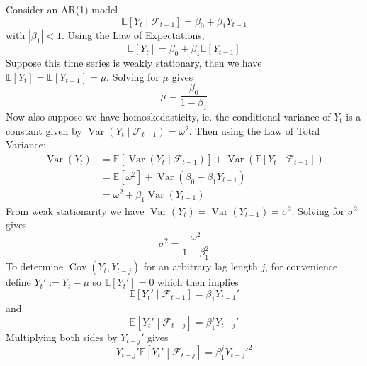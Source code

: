 \documentclass[11pt]{report} %
\begin{document}
Consider an AR(1) model
\begin{equation}
\mathbb{E}\left[Y_{t} \middle|\mathcal{F}_{t-1}\right] = \beta_{0} + \beta_{1}Y_{t - 1}
\end{equation}
with $\left|\beta_{1}\right| < 1$. Using the Law of Expectations,
\begin{equation}
\mathbb{E}\left[Y_{t}\right] = \beta_{0} + \beta_{1}\mathbb{E}\left[Y_{t - 1}\right]
\end{equation}
Suppose this time series is weakly stationary, then we have $\mathbb{E}\left[Y_{t}\right] = \mathbb{E}\left[Y_{t - 1}\right] = \mu$. Solving for $\mu$ gives
\begin{equation}
\mu = \dfrac{\beta_{0}}{1 - \beta_{1}}
\end{equation}
Now also suppose we have homoskedasticity, ie. the conditional variance of $Y_{t}$ is a constant given by $\operatorname{Var}\left(Y_{t}\middle|\mathcal{F}_{t-1}\right) = \omega^{2}$. Then using the Law of Total Variance:
\begin{align}
\operatorname{Var}\left(Y_{t}\right) &= \mathbb{E}\left[\operatorname{Var}\left(Y_{t}\middle|\mathcal{F}_{t-1}\right)\right] + \operatorname{Var}\left( \mathbb{E}\left[Y_{t}\middle|\mathcal{F}_{t-1}\right]\right) \\
&= \mathbb{E}\left[\omega^{2}\right] + \operatorname{Var}\left(\beta_{0} + \beta_{1}Y_{t - 1}\right) \\
&= \omega^{2} + \beta_{1}\operatorname{Var}\left(Y_{t - 1}\right)
\end{align}
From weak stationarity we have $\operatorname{Var}\left(Y_{t}\right) = \operatorname{Var}\left(Y_{t - 1}\right) = \sigma^{2}$. Solving for $\sigma^{2}$ gives
\begin{equation}
\sigma^{2} = \dfrac{\omega^{2}}{1 - \beta_{1}^{2}}
\end{equation}
To determine $\operatorname{Cov}\left(Y_{t}, Y_{t - j}\right)$ for an arbitrary lag length $j$, for convenience define $Y_{t}' := Y_{t} - \mu$ so $\mathbb{E}\left[Y_{t}'\right] = 0$ which then implies
\begin{equation}
\mathbb{E}\left[Y_{t}'\middle|\mathcal{F}_{t-1}\right] = \beta_{1}Y_{t - 1}'
\end{equation}
and
\begin{equation}
\mathbb{E}\left[Y_{t}'\middle|\mathcal{F}_{t-j}\right] = \beta_{1}^{j}Y_{t - j}'
\end{equation}
Multiplying both sides by $Y_{t - j}'$ gives
\begin{equation}
Y_{t - j}'\mathbb{E}\left[Y_{t}'\middle|\mathcal{F}_{t-j}\right] = \beta_{1}^{j}Y_{t - j}'^{2}
\end{equation}
\end{document}
